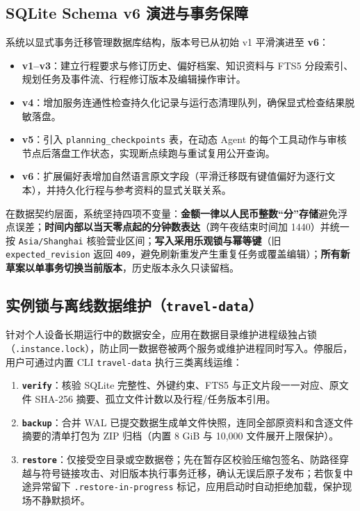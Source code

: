 \subsection{SQLite Schema v6 演进与事务保障}

系统以显式事务迁移管理数据库结构，版本号已从初始 v1 平滑演进至 \textbf{v6}：

\begin{itemize}
  \item \textbf{v1--v3}：建立行程要求与修订历史、偏好档案、知识资料与 FTS5 分段索引、规划任务及事件流、行程修订版本及编辑操作审计。
  \item \textbf{v4}：增加服务连通性检查持久化记录与运行态清理队列，确保显式检查结果脱敏落盘。
  \item \textbf{v5}：引入 \texttt{planning\_checkpoints} 表，在动态 Agent 的每个工具动作与审核节点后落盘工作状态，实现断点续跑与重试复用公开查询。
  \item \textbf{v6}：扩展偏好表增加自然语言原文字段（平滑迁移既有键值偏好为逐行文本），并持久化行程与参考资料的显式关联关系。
\end{itemize}

在数据契约层面，系统坚持四项不变量：\textbf{金额一律以人民币整数“分”存储}避免浮点误差；\textbf{时间内部以当天零点起的分钟数表达}（跨午夜结束时间加 1440）并统一按 \texttt{Asia/Shanghai} 核验营业区间；\textbf{写入采用乐观锁与幂等键}（旧 \texttt{expected\_revision} 返回 \texttt{409}，避免刷新重发产生重复任务或覆盖编辑）；\textbf{所有新草案以单事务切换当前版本}，历史版本永久只读留档。

\subsection{实例锁与离线数据维护（\texttt{travel-data}）}

针对个人设备长期运行中的数据安全，应用在数据目录维护进程级独占锁（\texttt{.instance.lock}），防止同一数据卷被两个服务或维护进程同时写入。停服后，用户可通过内置 CLI \texttt{travel-data} 执行三类离线运维：

\begin{enumerate}
  \item \textbf{\texttt{verify}}：核验 SQLite 完整性、外键约束、FTS5 与正文片段一一对应、原文件 SHA-256 摘要、孤立文件计数以及行程/任务版本引用。
  \item \textbf{\texttt{backup}}：合并 WAL 已提交数据生成单文件快照，连同全部原资料和含逐文件摘要的清单打包为 ZIP 归档（内置 8 GiB 与 10,000 文件展开上限保护）。
  \item \textbf{\texttt{restore}}：仅接受空目录或空数据卷；先在暂存区校验压缩包签名、防路径穿越与符号链接攻击、对旧版本执行事务迁移，确认无误后原子发布；若恢复中途异常留下 \texttt{.restore-in-progress} 标记，应用启动时自动拒绝加载，保护现场不静默损坏。
\end{enumerate}
